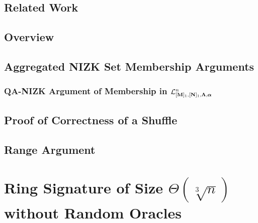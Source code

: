     \section{Related Work} \label{sec:set-memb-rel-work}

        

    \section{Overview} \label{sec:shuf-rp-overview}

        

    \section{Aggregated NIZK Set Membership Arguments} \label{sec:aZKSMP}

        

        \subsection{QA-NIZK Argument of Membership in $\mathcal{L}_{[\mathbf{{M}}]_1,[\mathbf{{N}}]_1,\mathbf{{\Lambda}},{\boldsymbol \alpha}}^n$} \label{sec:bin-lan-constr}

            

    \section{Proof of Correctness of a Shuffle} \label{sec:shuffle}

        

    \section{Range Argument} \label{sec:range-proof}

        


%    

\chapter{Ring Signature of Size $\Theta(\sqrt[3]{n})$ without Random O\-ra\-cles} \label{sec:opt-rs}

